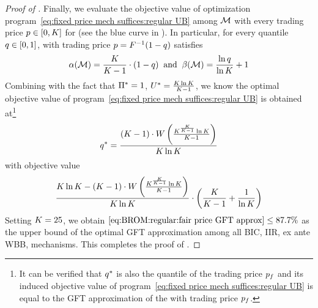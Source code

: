 \begin{proof}[Proof of ]
Finally, we evaluate the objective value of optimization program~\eqref{eq:fixed price mech suffices:regular UB} among {\FixPrice} $\mathcal{M}$ with every trading price $p\in[0, K]$ for  (see the blue curve in ). In particular, for every quantile $q\in[0, 1]$, {\FixPrice} with trading price $p = F^{-1}(1 - q)$ satisfies
\begin{align*}
    \alpha(\mathcal{M}) = \frac{K}{K - 1}\cdot (1 - q)
    \;\;
    \mbox{and}
    \;\;
    \beta(\mathcal{M}) = \frac{\ln q}{\ln K} + 1 
\end{align*}
Combining with the fact that $\Pi^* = 1$, $U^* = \frac{K\ln K}{K - 1}$, we know the optimal objective value of program~\eqref{eq:fixed price mech suffices:regular UB} is obtained at\footnote{It can be verified that $q^*$ is also the quantile of the {\ksfair} trading price $p_f$ and its induced objective value of program~\ref{eq:fixed price mech suffices:regular UB} is equal to the GFT approximation of the {\ksfair} {\FixPrice} with trading price $p_f$.}
\begin{align}
\label{eq:BROM:regular:fair price}
    q^* = \frac{(K - 1)\cdot W\left(\frac{K^{\frac{K}{K-1}}\ln K}{K - 1}\right)}{K\ln K}
\end{align}
with objective value
\begin{align}
\label{eq:BROM:regular:fair price GFT approx}
    \frac{K\ln K - (K - 1)\cdot W\left(\frac{K^{\frac{K}{K-1}}\ln K}{K - 1}\right)}{K\ln K}
    \cdot \left(
    \frac{K}{K - 1
    }
    +\frac{1}{\ln K}
    \right)
\end{align}
Setting $K = 25$, we obtain $\text{\eqref{eq:BROM:regular:fair price GFT approx}} \leq {87.7\%}$ as the upper bound of the optimal GFT approximation among all BIC, IIR, ex ante WBB, {\ksfair} mechanisms. This completes the proof of .
\end{proof}
